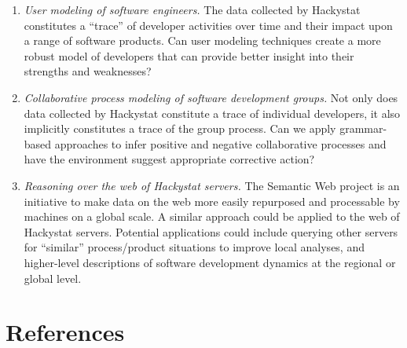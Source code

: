 \begin{enumerate}
  
\item {\em User modeling of software engineers.}  The data collected by
  Hackystat constitutes a ``trace'' of developer activities over time and
  their impact upon a range of software products.  Can user modeling
  techniques create a more robust model of developers that can provide
  better insight into their strengths and weaknesses?
  
\item {\em Collaborative process modeling of software development groups.}
  Not only does data collected by Hackystat constitute a trace of
  individual developers, it also implicitly constitutes a trace of the
  group process.  Can we apply grammar-based approaches to infer positive
  and negative collaborative processes and have the environment suggest
  appropriate corrective action?

\item {\em Reasoning over the web of Hackystat servers.}  
  The Semantic Web project is an initiative to make data on the web more
  easily repurposed and processable by machines on a global scale. A
  similar approach could be applied to the web of Hackystat
  servers. Potential applications could include querying other servers for
  ``similar'' process/product situations to improve local analyses, and
  higher-level descriptions of software development dynamics at the
  regional or global level. 

\end{enumerate}


\section*{References}










